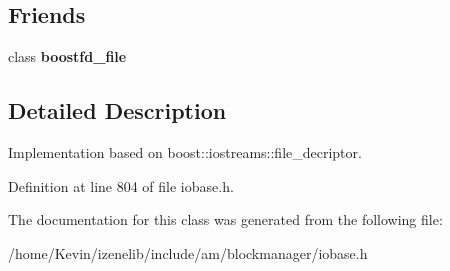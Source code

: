 \subsection*{Friends}
\begin{CompactItemize}
\item 
\hypertarget{classboostfd__request_6f659a8c47e4333d9d49f1e05c8d9a45}{
class \textbf{boostfd\_\-file}}
\label{classboostfd__request_6f659a8c47e4333d9d49f1e05c8d9a45}

\end{CompactItemize}


\subsection{Detailed Description}
Implementation based on boost::iostreams::file\_\-decriptor. 

Definition at line 804 of file iobase.h.

The documentation for this class was generated from the following file:\begin{CompactItemize}
\item 
/home/Kevin/izenelib/include/am/blockmanager/iobase.h\end{CompactItemize}
